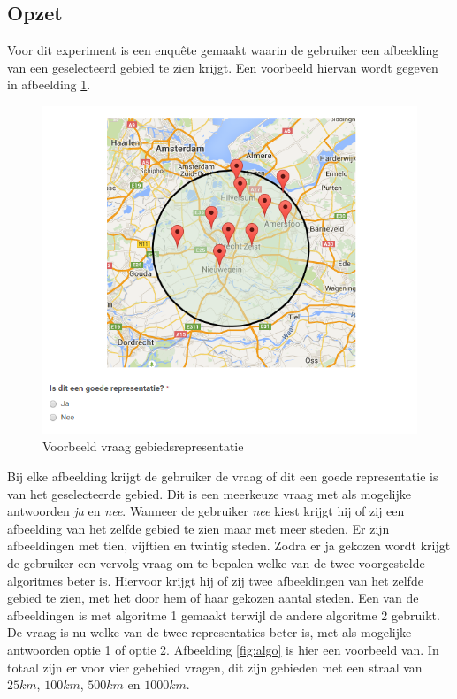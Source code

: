 \documentclass[twoside,openright]{uva-bachelor-thesis}
\begin{document}
		\subsection{Opzet}
			Voor dit experiment is een enqu\^ete gemaakt waarin de gebruiker een afbeelding van een geselecteerd gebied te zien krijgt. Een voorbeeld hiervan wordt gegeven in afbeelding \ref{fig:area_rep}.
			\begin{figure}[!htb]
				\centering
				\includegraphics[scale=0.8]{./img/area_rep.png}
				\caption{Voorbeeld vraag gebiedsrepresentatie}
				\label{fig:area_rep}
			\end{figure}
			Bij elke afbeelding krijgt de gebruiker de vraag of dit een goede representatie is van het geselecteerde gebied. Dit is een meerkeuze vraag met als mogelijke antwoorden \textit{ja} en \textit{nee}. Wanneer de gebruiker \textit{nee} kiest krijgt hij of zij een afbeelding van het zelfde gebied te zien maar met meer steden. Er zijn afbeeldingen met tien, vijftien en twintig steden. Zodra er ja gekozen wordt krijgt de gebruiker een vervolg vraag om te bepalen welke van de twee voorgestelde algoritmes beter is. Hiervoor krijgt hij of zij twee afbeeldingen van het zelfde gebied te zien, met het door hem of haar gekozen aantal steden. Een van de afbeeldingen is met algoritme 1 gemaakt terwijl de andere algoritme 2 gebruikt. De vraag is nu welke van de twee representaties beter is, met als mogelijke antwoorden optie 1 of optie 2. Afbeelding \ref{fig:algo} is hier een voorbeeld van. In totaal zijn er voor vier gebebied vragen, dit zijn gebieden met een straal van $25km$, $100km$, $500km$ en $1000km$.
\end{document}
